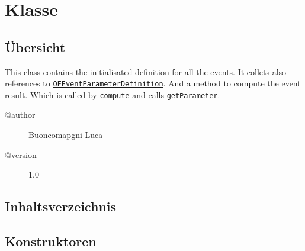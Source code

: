 
\section[OFEventDefinition]{Klasse }\label{ontologyFramework.OFEventManagement.OFLogicalEventManagement.OFEventDefinition-class}
\subsection{Übersicht}
This class contains the initialisated definition for all the events. 
 It collets also references to \texttt{\hyperlink{ontologyFramework.OFEventManagement.OFEventParameterDefinition-class}{OFEventParameterDefinition}}.
 And a method to compute the event result. Which is called by \texttt{\hyperlink{ontologyFramework.OFEventManagement.OFLogicalEventManagement.OFEventAggregation.compute(ontologyFramework.OFRunning.OFInvokingManager.OFBuildedListInvoker)}{compute}}
 and calls \texttt{\hyperlink{ontologyFramework.OFEventManagement.OFEventParameterDefinition.getParameter()}{getParameter}}.
\begin{description}
\item[@author] 
Buoncomapgni Luca
\item[@version] 
1.0
\end{description}
\subsection{Inhaltsverzeichnis}
\subsection{Konstruktoren}
\begin{description}
\item[{\label{ontologyFramework.OFEventManagement.OFLogicalEventManagement.OFEventDefinition(java.lang.String)}}]
~ 
\end{description}
